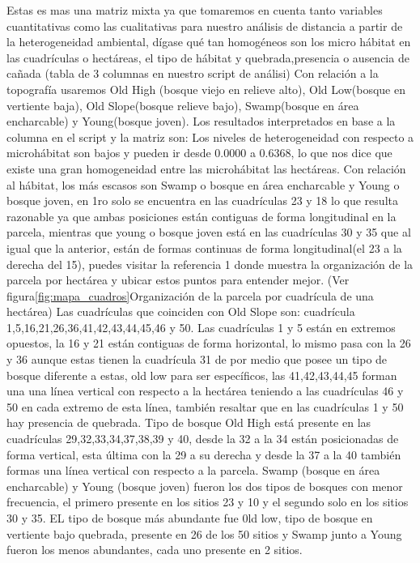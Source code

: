 \documentclass[11pt,]{article}
\begin{document}
Estas es mas una matriz mixta ya que tomaremos en cuenta tanto variables
cuantitativas como las cualitativas para nuestro análisis de distancia a
partir de la heterogeneidad ambiental, dígase qué tan homogéneos son los
micro hábitat en las cuadrículas o hectáreas, el tipo de hábitat y
quebrada,presencia o ausencia de cañada (tabla de 3 columnas en nuestro
script de análisi) Con relación a la topografía usaremos Old High
(bosque viejo en relieve alto), Old Low(bosque en vertiente baja), Old
Slope(bosque relieve bajo), Swamp(bosque en área encharcable) y
Young(bosque joven). Los resultados interpretados en base a la columna
en el script y la matriz son: Los niveles de heterogeneidad con respecto
a microhábitat son bajos y pueden ir desde 0.0000 a 0.6368, lo que nos
dice que existe una gran homogeneidad entre las microhábitat las
hectáreas. Con relación al hábitat, los más escasos son Swamp o bosque
en área encharcable y Young o bosque joven, en 1ro solo se encuentra en
las cuadrículas 23 y 18 lo que resulta razonable ya que ambas posiciones
están contiguas de forma longitudinal en la parcela, mientras que young
o bosque joven está en las cuadrículas 30 y 35 que al igual que la
anterior, están de formas continuas de forma longitudinal(el 23 a la
derecha del 15), puedes visitar la referencia 1 donde muestra la
organización de la parcela por hectárea y ubicar estos puntos para
entender mejor. (Ver figura\ref{fig:mapa_cuadros}Organización de la
parcela por cuadrícula de una hectárea) Las cuadrículas que coinciden
con Old Slope son: cuadrícula 1,5,16,21,26,36,41,42,43,44,45,46 y 50.
Las cuadrículas 1 y 5 están en extremos opuestos, la 16 y 21 están
contiguas de forma horizontal, lo mismo pasa con la 26 y 36 aunque estas
tienen la cuadrícula 31 de por medio que posee un tipo de bosque
diferente a estas, old low para ser específicos, las 41,42,43,44,45
forman una una línea vertical con respecto a la hectárea teniendo a las
cuadrículas 46 y 50 en cada extremo de esta línea, también resaltar que
en las cuadrículas 1 y 50 hay presencia de quebrada. Tipo de bosque Old
High está presente en las cuadrículas 29,32,33,34,37,38,39 y 40, desde
la 32 a la 34 están posicionadas de forma vertical, esta última con la
29 a su derecha y desde la 37 a la 40 también formas una línea vertical
con respecto a la parcela. Swamp (bosque en área encharcable) y Young
(bosque joven) fueron los dos tipos de bosques con menor frecuencia, el
primero presente en los sitios 23 y 10 y el segundo solo en los sitios
30 y 35. EL tipo de bosque más abundante fue 0ld low, tipo de bosque en
vertiente bajo quebrada, presente en 26 de los 50 sitios y Swamp junto a
Young fueron los menos abundantes, cada uno presente en 2 sitios.
\end{document}
